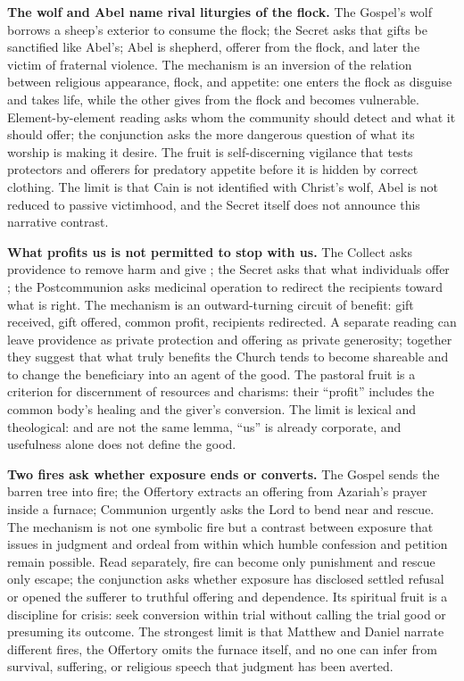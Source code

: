\noindent\textbf{The wolf and Abel name rival liturgies of the flock.\enspace{}}
The Gospel's wolf borrows a sheep's exterior to consume the flock; the Secret asks that gifts be sanctified like Abel's; Abel is shepherd, offerer from the flock, and later the victim of fraternal violence. The mechanism is an inversion of the relation between religious appearance, flock, and appetite: one enters the flock as disguise and takes life, while the other gives from the flock and becomes vulnerable. Element-by-element reading asks whom the community should detect and what it should offer; the conjunction asks the more dangerous question of what its worship is making it desire. The fruit is self-discerning vigilance that tests protectors and offerers for predatory appetite before it is hidden by correct clothing. The limit is that Cain is not identified with Christ's wolf, Abel is not reduced to passive victimhood, and the Secret itself does not announce this narrative contrast.

\noindent\textbf{What profits us is not permitted to stop with us.\enspace{}}
The Collect asks providence to remove harm and give ; the Secret asks that what individuals offer ; the Postcommunion asks medicinal operation to redirect the recipients toward what is right. The mechanism is an outward-turning circuit of benefit: gift received, gift offered, common profit, recipients redirected. A separate reading can leave providence as private protection and offering as private generosity; together they suggest that what truly benefits the Church tends to become shareable and to change the beneficiary into an agent of the good. The pastoral fruit is a criterion for discernment of resources and charisms: their ``profit'' includes the common body's healing and the giver's conversion. The limit is lexical and theological:  and  are not the same lemma, ``us'' is already corporate, and usefulness alone does not define the good.

\noindent\textbf{Two fires ask whether exposure ends or converts.\enspace{}}
The Gospel sends the barren tree into fire; the Offertory extracts an offering from Azariah's prayer inside a furnace; Communion urgently asks the Lord to bend near and rescue. The mechanism is not one symbolic fire but a contrast between exposure that issues in judgment and ordeal from within which humble confession and petition remain possible. Read separately, fire can become only punishment and rescue only escape; the conjunction asks whether exposure has disclosed settled refusal or opened the sufferer to truthful offering and dependence. Its spiritual fruit is a discipline for crisis: seek conversion within trial without calling the trial good or presuming its outcome. The strongest limit is that Matthew and Daniel narrate different fires, the Offertory omits the furnace itself, and no one can infer from survival, suffering, or religious speech that judgment has been averted.

